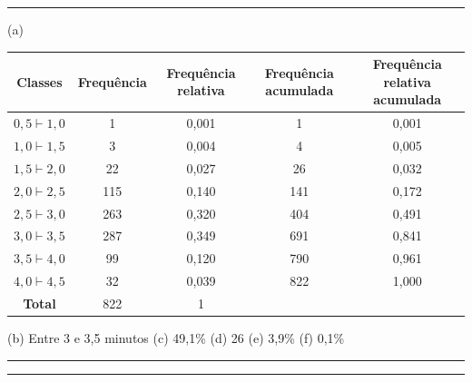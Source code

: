 \documentclass[a4paper,11pt,fleqn]{article}\usepackage[]{graphicx}\usepackage[]{color}
\theoremstyle{definition}
\begin{document}

\vspace{0.3cm}
\hrule
\vspace{0.3cm}

\begin{compactenum}[6.]
\item (a)

\begin{table}[h]
  \centering
  \begin{tabular}{ccccc}
    \hline
    \textbf{Classes} & \textbf{Frequência} & \textbf{Frequência
      relativa} & \textbf{Frequência acumulada} & \textbf{Frequência
      relativa acumulada} \\
    \hline
    $0,5 \vdash 1,0$ & 1   & 0,001 & 1   & 0,001 \\
    $1,0 \vdash 1,5$ & 3   & 0,004 & 4   & 0,005 \\
    $1,5 \vdash 2,0$ & 22  & 0,027 & 26  & 0,032 \\
    $2,0 \vdash 2,5$ & 115 & 0,140 & 141 & 0,172 \\
    $2,5 \vdash 3,0$ & 263 & 0,320 & 404 & 0,491 \\
    $3,0 \vdash 3,5$ & 287 & 0,349 & 691 & 0,841 \\
    $3,5 \vdash 4,0$ & 99  & 0,120 & 790 & 0,961 \\
    $4,0 \vdash 4,5$ & 32  & 0,039 & 822 & 1,000 \\
    \hline
    \textbf{Total} & 822 & 1 & & \\
    \hline
  \end{tabular}
\end{table}
\begin{compactenum}
  \item[] (b) Entre 3 e 3,5 minutos \quad (c) 49,1\%  \quad (d) 26  \quad
    (e) 3,9\%  \quad (f) 0,1\%
  \end{compactenum}
\end{compactenum}

\vspace{0.3cm}
\hrule
\vspace{0.3cm}

\clearpage

\vspace{0.3cm}
\hrule
\vspace{0.3cm}
\end{document}
